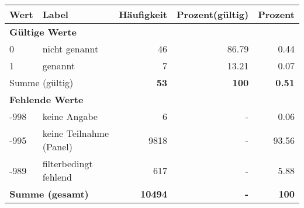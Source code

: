      \begin{longtable}{lXrrr}
     \toprule
     \textbf{Wert} & \textbf{Label} & \textbf{Häufigkeit} & \textbf{Prozent(gültig)} & \textbf{Prozent} \\
     \endhead
     \midrule
     \multicolumn{5}{l}{\textbf{Gültige Werte}}\\

     0 &
     \multicolumn{1}{X}{ nicht genannt   } &


       \num{46} &
       \num[round-mode=places,round-precision=2]{86.79} &
         \num[round-mode=places,round-precision=2]{0.44} \\

     1 &
     \multicolumn{1}{X}{ genannt   } &


       \num{7} &
       \num[round-mode=places,round-precision=2]{13.21} &
         \num[round-mode=places,round-precision=2]{0.07} \\
     \midrule
     \multicolumn{2}{l}{Summe (gültig)} &
       \textbf{\num{53}} &
     \textbf{\num{100}} &
       \textbf{\num[round-mode=places,round-precision=2]{0.51}} \\
     \multicolumn{5}{l}{\textbf{Fehlende Werte}}\\
       -998 &
       keine Angabe &
         \num{6} &
        - &
         \num[round-mode=places,round-precision=2]{0.06} \\
       -995 &
       keine Teilnahme (Panel) &
         \num{9818} &
        - &
         \num[round-mode=places,round-precision=2]{93.56} \\
       -989 &
       filterbedingt fehlend &
         \num{617} &
        - &
         \num[round-mode=places,round-precision=2]{5.88} \\
     \midrule
     \multicolumn{2}{l}{\textbf{Summe (gesamt)}} &
          \textbf{\num{10494}} &
        \textbf{-} &
        \textbf{\num{100}} \\
     \bottomrule
     \end{longtable}
     
